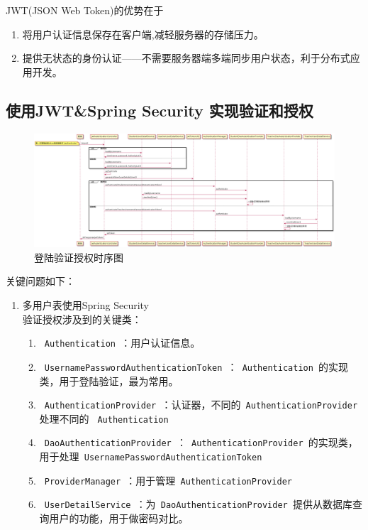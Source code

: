 JWT(JSON Web Token)的优势在于
\begin{enumerate}
    \item 将用户认证信息保存在客户端,减轻服务器的存储压力。
    \item 提供无状态的身份认证——不需要服务器端多端同步用户状态，利于分布式应用开发。\cite{.2019h}
\end{enumerate}


\subsection{使用JWT\&Spring Security 实现验证和授权}

\begin{figure}[h]
    \centering
    \includegraphics[scale = 0.3, angle = 90]{out/uml/时序图/时序图-authentication/时序图-authentication.png}
    \caption{\song\wuhao 登陆验证授权时序图}
\end{figure}

关键问题如下：
\begin{enumerate}
    \item 多用户表使用Spring Security\\
    验证授权涉及到的关键类：
    \begin{enumerate}
        \item \lstinline[language = Java]| Authentication |：用户认证信息。
        \item \lstinline[language = Java]| UsernamePasswordAuthenticationToken |：\lstinline[language = Java]| Authentication |的实现类，用于登陆验证，最为常用。
        \item \lstinline[language = Java]| AuthenticationProvider |：认证器，不同的\lstinline[language = Java]| AuthenticationProvider | 处理不同的 \lstinline[language = Java]| Authentication |
        \item \lstinline[language = Java]| DaoAuthenticationProvider |：\lstinline[language = Java]| AuthenticationProvider |的实现类，用于处理\lstinline[language = Java]| UsernamePasswordAuthenticationToken |
        \item \lstinline[language = Java]| ProviderManager |：用于管理\lstinline[language = Java]| AuthenticationProvider |
        \item \lstinline[language = Java]| UserDetailService |：为\lstinline[language = Java]| DaoAuthenticationProvider |提供从数据库查询用户的功能，用于做密码对比。
    \end{enumerate}
\end{enumerate}